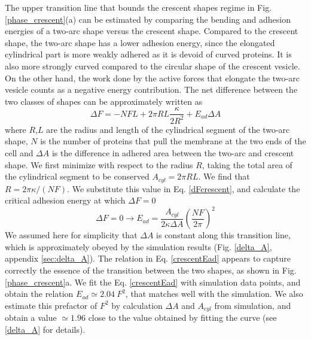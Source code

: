 \documentclass[pre,amsmath]{revtex4}
\begin{document}
The upper transition line that bounds the crescent shapes regime in Fig. \ref{phase_crescent}(a) can be estimated by comparing the bending and adhesion energies of a two-arc shape versus the crescent shape. Compared to the crescent shape, the two-arc shape has a lower adhesion energy, since the elongated cylindrical part is more weakly adhered as it is devoid of curved proteins. It is also more strongly curved compared to the circular shape of the crescent vesicle. On the other hand, the work done by the active forces that elongate the two-arc vesicle counts as a negative energy contribution. The net difference between the two classes of shapes can be approximately written as
\begin{equation}
    \Delta F=-NFL+2\pi RL\frac{\kappa}{2R^2}+E_{ad}\Delta A
    \label{dFcrescent}
\end{equation}
where $R$,$L$ are the radius and length of the cylindrical segment of the two-arc shape, $N$ is the number of proteins that pull the membrane at the two ends of the cell and $\Delta A$ is the difference in adhered area between the two-arc and crescent shape. We first minimize with respect to the radius $R$, taking the total area of the cylindrical segment to be conserved $A_{cyl}=2\pi RL$. We find that $R=2\pi\kappa/(NF)$. We substitute this value in Eq. \ref{dFcrescent}, and calculate the critical adhesion energy at which $\Delta F=0$
\begin{equation}
    \Delta F=0\rightarrow E_{ad}=\frac{A_{cyl}}{2\kappa\Delta A}\left(\frac{NF}{2\pi}\right)^2
    \label{crescentEad}
\end{equation}
We assumed here for simplicity that $\Delta A$ is constant along this transition line, which is approximately obeyed by the simulation results (Fig. \ref{delta_A}, appendix \ref{sec:delta_A}). The relation in Eq. \ref{crescentEad} appears to capture correctly the essence of the transition between the two shapes, as shown in Fig. \ref{phase_crescent}a. We fit the Eq. \ref{crescentEad} with simulation data points, and obtain the relation $E_{ad} \simeq 2.04~F^2$, that matches well with the simulation. We also estimate this prefactor of $F^2$ by calculation $\Delta A$ and $A_{cyl}$ from simulation, and obtain a value $\simeq 1.96$ close to the value obtained by fitting the curve (see \ref{delta_A} for details).
\end{document}
